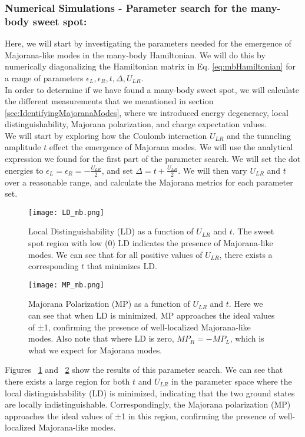 \documentclass[11pt, letterpaper, titlepage]{article}
\begin{document}
\subsubsection{Numerical Simulations - Parameter search for the many-body sweet spot:}
Here, we will start by investigating the parameters needed for the emergence of Majorana-like modes in the many-body Hamiltonian. We will do this by numerically diagonalizing the Hamiltonian matrix in Eq. \ref{eq:mbHamiltonian} for a range of parameters $ϵ_L, ϵ_R, t, Δ, U_{LR}$.\\
In order to determine if we have found a many-body sweet spot, we will calculate the different measurements that we meantioned in section \ref{sec:IdentifyingMajoranaModes}, where we introduced energy degeneracy, local distinguishability, Majorana polarization, and charge expectation values.\\
We will start by exploring how the Coulomb interaction $U_{LR}$ and the tunneling amplitude $t$ effect the emergence of Majorana modes. We will use the analytical expression we found for the first part of the parameter search. We will set the dot energies to $ϵ_L = ϵ_R = -\frac{U_{LR}}{2}$, and set $Δ = t + \frac{U_{LR}}{2}$. We will then vary $U_{LR}$ and $t$ over a reasonable range, and calculate the Majorana metrics for each parameter set.\\
\begin{figure}[htbp]
  \centering
  \texttt{[image: LD\_mb.png]}
  \caption{Local Distinguishability (LD) as a function of $U_{LR}$ and $t$. The sweet spot region with low (0) LD indicates the presence of Majorana-like modes. We can see that for all positive values of $U_{LR}$, there exists a corresponding $t$ that minimizes LD.}
  \label{fig:mb_LD}
\end{figure}
\begin{figure}[htbp]
  \centering
  \texttt{[image: MP\_mb.png]}
  \caption{Majorana Polarization (MP) as a function of $U_{LR}$ and $t$. Here we can see that when LD is minimized, MP approaches the ideal values of ±1, confirming the presence of well-localized Majorana-like modes. Also note that where LD is zero, $MP_R=-MP_L$, which is what we expect for Majorana modes.}
  \label{fig:mb_MP}
\end{figure}
Figures ~\ref{fig:mb_LD} and ~\ref{fig:mb_MP} show the results of this parameter search. We can see that there exists a large region for both $t$ and $U_{LR}$ in the parameter space where the local distinguishability (LD) is minimized, indicating that the two ground states are locally indistinguishable. Correspondingly, the Majorana polarization (MP) approaches the ideal values of ±1 in this region, confirming the presence of well-localized Majorana-like modes.
\end{document}
